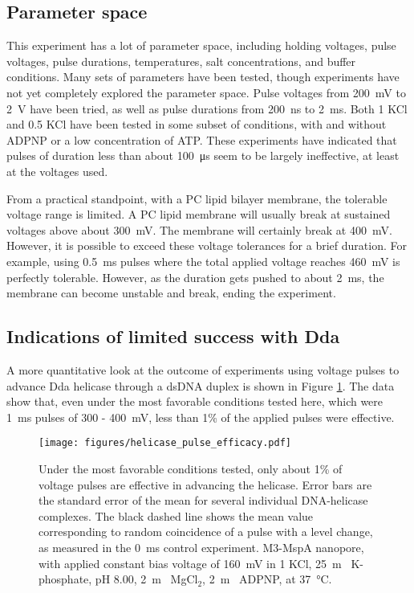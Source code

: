 \subsection{Parameter space}

This experiment has a lot of parameter space, including holding voltages, pulse voltages, pulse durations, temperatures, salt concentrations, and buffer conditions.  Many sets of parameters have been tested, though experiments have not yet completely explored the parameter space.  Pulse voltages from \SI{200}{\mV} to \SI{2}{\V} have been tried, as well as pulse durations from \SI{200}{\ns} to \SI{2}{\ms}.  Both \SI{1}{\Molar} KCl and \SI{0.5}{\Molar} KCl have been tested in some subset of conditions, with and without ADPNP or a low concentration of ATP.  These experiments have indicated that pulses of duration less than about \SI{100}{\micro\s} seem to be largely ineffective, at least at the voltages used.

From a practical standpoint, with a PC lipid bilayer membrane, the tolerable voltage range is limited.  A PC lipid membrane will usually break at sustained voltages above about \SI{300}{\mV}.  The membrane will certainly break at \SI{400}{\mV}.  However, it is possible to exceed these voltage tolerances for a brief duration.  For example, using \SI{0.5}{\ms} pulses where the total applied voltage reaches \SI{460}{\mV} is perfectly tolerable.  However, as the duration gets pushed to about \SI{2}{\ms}, the membrane can become unstable and break, ending the experiment.

\subsection{Indications of limited success with Dda}

A more quantitative look at the outcome of experiments using voltage pulses to advance Dda helicase through a dsDNA duplex is shown in Figure \ref{fig:helicase_pulse_efficacy}.  The data show that, even under the most favorable conditions tested here, which were \SI{1}{\ms} pulses of \num{300} - \SI{400}{\mV}, less than \num{1}\% of the applied pulses were effective.

\begin{figure}[h]
\begin{centering}
\texttt{[image: figures/helicase\_pulse\_efficacy.pdf]}
\caption[Quantifying efficacy of pulses]{Under the most favorable conditions tested, only about 1\% of voltage pulses are effective in advancing the helicase.  Error bars are the standard error of the mean for several individual DNA-helicase complexes.  The black dashed line shows the mean value corresponding to random coincidence of a pulse with a level change, as measured in the \SI{0}{\ms} control experiment.  M3-MspA nanopore, with applied constant bias voltage of \SI{160}{\mV} in \SI{1}{\Molar} KCl, \SI{25}{\m\Molar} K-phosphate, pH \num{8.00}, \SI{2}{\m\Molar} MgCl$_2$, \SI{2}{\m\Molar} ADPNP, at \SI{37}{\celsius}.}
\label{fig:helicase_pulse_efficacy}
\end{centering}
\end{figure}


